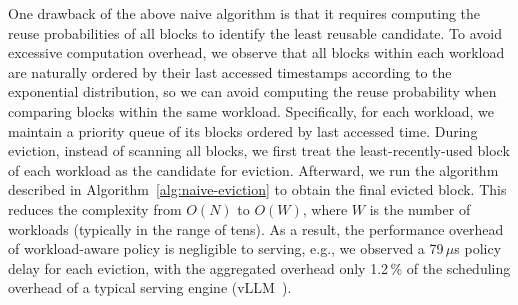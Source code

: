 One drawback of the above naive algorithm is that it
requires computing the reuse probabilities of all {\kvcache} blocks to identify the least reusable candidate.
To avoid excessive computation overhead,
we observe that all {\kvcache} blocks
within each workload are naturally ordered by their last accessed timestamps according to the exponential distribution,
so we can avoid computing the reuse probability when comparing blocks within the same workload.
Specifically, for each workload, we maintain
a priority queue of its {\kvcache} blocks ordered by last accessed time.
During eviction, instead of scanning all blocks, we first treat the least-recently-used block
of each workload as the candidate for eviction.
Afterward, we run the algorithm described in Algorithm~\ref{alg:naive-eviction}
to obtain the final evicted block.
This reduces the complexity from $O(N)$ to $O(W)$,
where $W$ is the number of workloads (typically in the range of tens).
As a result, the performance overhead of workload-aware policy is negligible to serving,
e.g., we observed a 79\,$\mu$s policy delay for each eviction,
with the aggregated overhead only 1.2\,\% of the scheduling overhead 
of a typical serving engine (vLLM~\cite{vllm}). 

